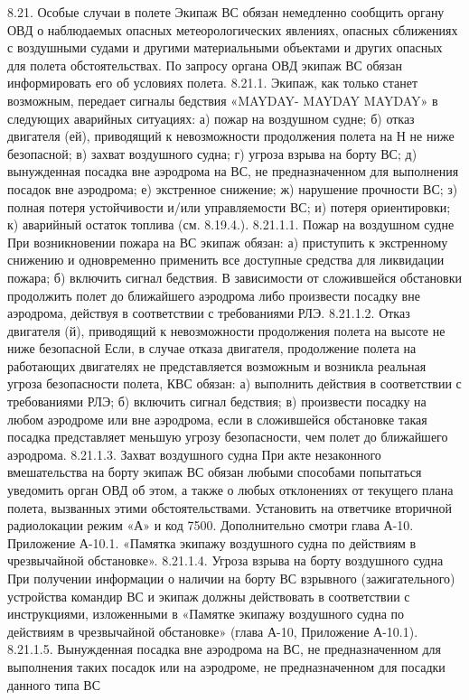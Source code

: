 8.21.	Особые случаи в полете
Экипаж ВС обязан немедленно сообщить органу ОВД о наблюдаемых опасных метеорологических явлениях, опасных сближениях с воздушными судами и другими материальными объектами и других опасных для полета обстоятельствах. По запросу органа ОВД экипаж ВС обязан информировать его об условиях полета.
8.21.1.	Экипаж, как только станет возможным, передает сигналы бедствия «MAYDAY- MAYDAY MAYDAY» в следующих аварийных ситуациях:
а)	пожар на воздушном судне;
б)	отказ двигателя (ей), приводящий к невозможности продолжения полета на Н не ниже безопасной;
в)	захват воздушного судна;
г)	угроза взрыва на борту ВС;
д)	вынужденная посадка вне аэродрома на ВС, не предназначенном для выполнения посадок вне аэродрома;
е)	экстренное снижение;
ж)	нарушение прочности ВС;
з)	полная потеря устойчивости и/или управляемости ВС;
и)	потеря ориентировки;
к)	аварийный остаток топлива (см. 8.19.4.).
8.21.1.1.	Пожар на воздушном судне
При возникновении пожара на ВС экипаж обязан:
а)	приступить к экстренному снижению и одновременно применить все доступные средства для ликвидации пожара;
б)	включить сигнал бедствия.
В зависимости от сложившейся обстановки продолжить полет до ближайшего аэродрома либо произвести посадку вне аэродрома, действуя в соответствии с требованиями РЛЭ.
8.21.1.2.	Отказ двигателя (й), приводящий к невозможности продолжения полета на высоте не ниже безопасной
Если, в случае отказа двигателя, продолжение полета на работающих двигателях не представляется возможным и возникла реальная угроза безопасности полета, КВС обязан:
а)	выполнить действия в соответствии с требованиями РЛЭ;
б)	включить сигнал бедствия;
в)	произвести посадку на любом аэродроме или вне аэродрома, если в сложившейся обстановке такая посадка представляет меньшую угрозу безопасности, чем полет до ближайшего аэродрома.
8.21.1.3.	Захват воздушного судна
При акте незаконного вмешательства на борту экипаж ВС обязан любыми способами попытаться уведомить орган ОВД об этом, а также о любых отклонениях от текущего плана полета, вызванных этими обстоятельствами. Установить на ответчике вторичной радиолокации режим «А» и код 7500.
Дополнительно смотри глава А-10. Приложение А-10.1. «Памятка экипажу воздушного судна по действиям в чрезвычайной обстановке».
8.21.1.4.	 Угроза взрыва на борту воздушного судна
При получении информации о наличии на борту ВС взрывного (зажигательного) устройства командир ВС и экипаж должны действовать в соответствии с инструкциями, изложенными в «Памятке экипажу воздушного судна по действиям в чрезвычайной обстановке» (глава А-10, Приложение А-10.1).
8.21.1.5.	Вынужденная посадка вне аэродрома на ВС, не предназначенном для выполнения таких посадок или на аэродроме, не предназначенном для посадки данного типа ВС
